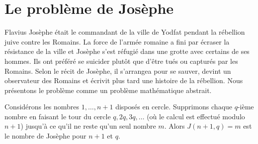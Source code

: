 
\section{Le problème de Josèphe}\label{s.josephus}


Flavius Josèphe était le commandant de la ville de Yodfat pendant la rébellion juive contre les Romains. La force  de l'armée romaine a fini par écraser la résistance de la ville et Josèphe s'est réfugié dans une grotte avec certains de ses hommes. Ils ont préféré se suicider plutôt que d'être tués ou capturés par les Romains. Selon le récit de Josèphe, il s'arrangea pour se sauver, devint un observateur des Romains et écrivit plus tard une histoire de la rébellion. Nous présentons le problème comme un problème mathématique abstrait.

\begin{definition}
Considérons les nombres $1,\ldots,n\!+\!1$ disposés en cercle. Supprimons chaque $q$-ième nombre en faisant le tour du cercle $q, 2q, 3q, \ldots$ (où le calcul est effectué modulo $n\!+\!1$) jusqu'à ce qu'il ne reste qu'un seul nombre $m$. Alors $J(n+1,q)=m$ est le nombre de Josèphe pour $n+1$ et $q$.
\end{definition}

